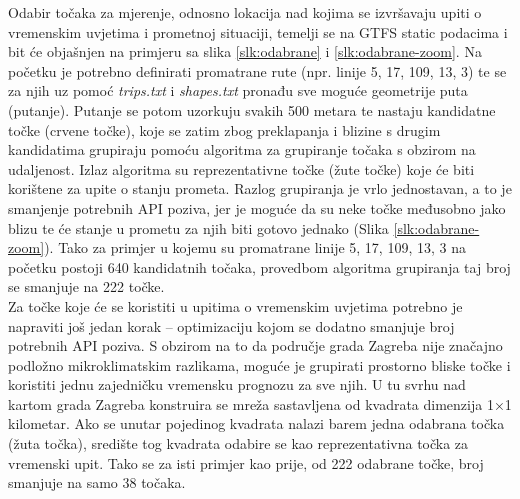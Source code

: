 \documentclass[seminarskirad]{fer}
\begin{document}
Odabir točaka za mjerenje, odnosno lokacija nad kojima se izvršavaju upiti o vremenskim uvjetima i prometnoj situaciji, temelji se na GTFS static podacima i bit će objašnjen na primjeru sa slika \ref{slk:odabrane} i \ref{slk:odabrane-zoom}. Na početku je potrebno definirati promatrane rute (npr. linije 5, 17, 109, 13, 3) te se za njih uz pomoć \textit{trips.txt} i \textit{shapes.txt} pronađu sve moguće geometrije puta (putanje). Putanje se potom uzorkuju svakih 500 metara te nastaju kandidatne točke  (crvene točke), koje se zatim zbog preklapanja i blizine s drugim kandidatima grupiraju pomoću algoritma za grupiranje točaka s obzirom na udaljenost. Izlaz algoritma su reprezentativne točke (žute točke) koje će biti korištene za upite o stanju prometa. Razlog grupiranja je vrlo jednostavan, a to je smanjenje potrebnih API poziva, jer je moguće da su neke točke međusobno jako blizu te će stanje u prometu za njih biti gotovo jednako (Slika \ref{slk:odabrane-zoom}). Tako za primjer u kojemu su promatrane linije 5, 17, 109, 13, 3 na početku postoji 640 kandidatnih točaka, provedbom algoritma grupiranja taj broj se smanjuje na 222 točke.\\
Za točke koje će se koristiti u upitima o vremenskim uvjetima potrebno je napraviti još jedan korak – optimizaciju kojom se dodatno smanjuje broj potrebnih API poziva. S obzirom na to da područje grada Zagreba nije značajno podložno mikroklimatskim razlikama, moguće je grupirati prostorno bliske točke i koristiti jednu zajedničku vremensku prognozu za sve njih. U tu svrhu nad kartom grada Zagreba konstruira se mreža sastavljena od kvadrata dimenzija 1×1 kilometar. Ako se unutar pojedinog kvadrata nalazi barem jedna odabrana točka (žuta točka), središte tog kvadrata odabire se kao reprezentativna točka za vremenski upit. Tako se za isti primjer kao prije, od 222 odabrane točke, broj smanjuje na samo 38 točaka.
\end{document}
